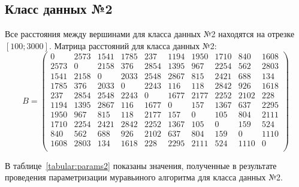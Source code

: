 \subsection{Класс данных №2}

Все расстояния между вершинами для класса данных №2 находятся на отрезке $[100; 3000]$. 
Матрица расстояний для класса данных №2:
\begin{equation}
	B = 
	\begin{pmatrix}
		0 & 2573 & 1541 & 1785 & 237 & 1194 & 1950 & 1710 & 840 & 1608 \\
		2573 & 0 & 2158 & 376 & 2854 & 1395 & 967 & 2254 & 562 & 2803 \\
		1541 & 2158 & 0 & 2033 & 2548 & 2867 & 815 & 2421 & 688 & 134 \\
		1785 & 376 & 2033 & 0 & 2243 & 116 & 118 & 2842 & 926 & 1618 \\
		237 & 2854 & 2548 & 2243 & 0 & 1677 & 2177 & 2252 & 2102 & 228 \\
		1194 & 1395 & 2867 & 116 & 1677 & 0 & 157 & 1367 & 637 & 2295 \\
		1950 & 967 & 815 & 118 & 2177 & 157 & 0 & 105 & 804 & 2111 \\
		1710 & 2254 & 2421 & 2842 & 2252 & 1367 & 105 & 0 & 159 & 524 \\
		840 & 562 & 688 & 926 & 2102 & 637 & 804 & 159 & 0 & 1110 \\
		1608 & 2803 & 134 & 1618 & 228 & 2295 & 2111 & 524 & 1110 & 0 \\
	\end{pmatrix}
\end{equation}

В таблице~\ref{tabular:params2} показаны значения, полученные в результате проведения параметризации муравьиного алгоритма для класса данных №2.

